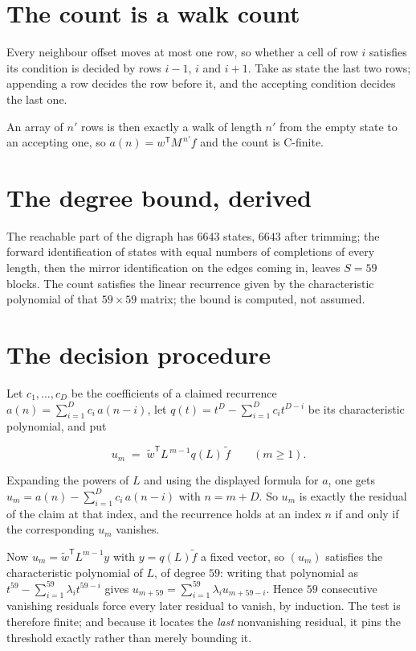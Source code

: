 \documentclass[11pt]{article}
\theoremstyle{definition}
\begin{document}
\section{The count is a walk count}

Every neighbour offset moves at most one row, so whether a cell of row $i$ satisfies its condition is decided by rows $i-1$, $i$ and $i+1$. Take as state the last two rows; appending a row decides the row before it, and the accepting condition decides the last one.

An array of $n'$ rows is then exactly a walk of length $n'$ from the empty state to an accepting one, so $a(n) = w^{\mathsf T}M^{\,n'}f$ and the count is C-finite.

\section{The degree bound, derived}

The reachable part of the digraph has $6643$ states, $6643$ after trimming; the forward identification of states with equal numbers of completions of every length, then the mirror identification on the edges coming in, leaves $S = 59$ blocks. The count satisfies the linear recurrence given by the characteristic polynomial of that $59\times59$ matrix; the bound is computed, not assumed.

\section{The decision procedure}

Let $c_1,\dots,c_D$ be the coefficients of a claimed recurrence $a(n) = \sum_{i=1}^{D} c_i\,a(n-i)$, let $q(t) = t^{D} - \sum_{i=1}^{D} c_i t^{D-i}$ be its characteristic polynomial, and put

\[u_m \;=\; \tilde w^{\mathsf T} L^{\,m-1} q(L)\,\tilde f \qquad (m \ge 1).\]

Expanding the powers of $L$ and using the displayed formula for $a$, one gets $u_m = a(n) - \sum_{i=1}^{D} c_i\,a(n-i)$ with $n = m + D$. So $u_m$ is exactly the residual of the claim at that index, and the recurrence holds at an index $n$ if and only if the corresponding $u_m$ vanishes.

Now $u_m = \tilde w^{\mathsf T} L^{m-1} y$ with $y = q(L)\tilde f$ a fixed vector, so $(u_m)$ satisfies the characteristic polynomial of $L$, of degree $59$: writing that polynomial as $t^{59} - \sum_{i=1}^{59} \lambda_i t^{59-i}$ gives $u_{m+59} = \sum_{i=1}^{59} \lambda_i u_{m+59-i}$. Hence $59$ consecutive vanishing residuals force every later residual to vanish, by induction. The test is therefore finite; and because it locates the {\itshape last} nonvanishing residual, it pins the threshold exactly rather than merely bounding it.
\end{document}
